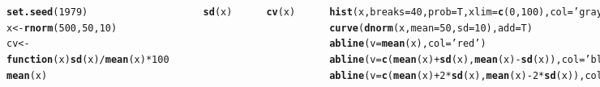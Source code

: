 \documentclass{beamer}\usepackage[]{graphicx}\usepackage[]{color}
\makeatletter
\newcommand{\hlnum}[1]{\textcolor[rgb]{0.686,0.059,0.569}{#1}}%
\newcommand{\hlstr}[1]{\textcolor[rgb]{0.192,0.494,0.8}{#1}}%
\newcommand{\hlopt}[1]{\textcolor[rgb]{0,0,0}{#1}}%
\newcommand{\hlstd}[1]{\textcolor[rgb]{0.345,0.345,0.345}{#1}}%
\newcommand{\hlkwa}[1]{\textcolor[rgb]{0.161,0.373,0.58}{\textbf{#1}}}%
\newcommand{\hlkwb}[1]{\textcolor[rgb]{0.69,0.353,0.396}{#1}}%
\newcommand{\hlkwc}[1]{\textcolor[rgb]{0.333,0.667,0.333}{#1}}%
\newcommand{\hlkwd}[1]{\textcolor[rgb]{0.737,0.353,0.396}{\textbf{#1}}}%
\newenvironment{kframe}{%
 \def\at@end@of@kframe{}%
 \ifinner\ifhmode%
  \def\at@end@of@kframe{\end{minipage}}%
  \begin{minipage}{\columnwidth}%
 \fi\fi%
 \def\FrameCommand##1{\hskip\@totalleftmargin \hskip-\fboxsep
 \colorbox{shadecolor}{##1}\hskip-\fboxsep
     \hskip-\linewidth \hskip-\@totalleftmargin \hskip\columnwidth}%
 \MakeFramed {\advance\hsize-\width
   \@totalleftmargin\z@ \linewidth\hsize
   \@setminipage}}%
 {\par\unskip\endMakeFramed%
 \at@end@of@kframe}
\newenvironment{knitrout}{}{} %
\renewenvironment{knitrout}{\setlength{\topsep}{0mm}}{}
\makeatother
\begin{document}
\begin{frame}[fragile]%

\begin{columns}[c]


\begin{knitrout}\tiny
{}\color{fgcolor}\begin{kframe}
\begin{alltt}
\hlkwd{set.seed}\hlstd{(}\hlnum{1979}\hlstd{)}
\hlstd{x} \hlkwb{<-} \hlkwd{rnorm}\hlstd{(}\hlnum{500}\hlstd{,}\hlnum{50}\hlstd{,}\hlnum{10}\hlstd{)}
\hlstd{cv} \hlkwb{<-} \hlkwa{function}\hlstd{(}\hlkwc{x}\hlstd{)} \hlkwd{sd}\hlstd{(x)}\hlopt{/}\hlkwd{mean}\hlstd{(x)} \hlopt{*} \hlnum{100}
\hlkwd{mean}\hlstd{(x)}
\end{alltt}
\begin{verbatim}
## [1] 50.36405
\end{verbatim}
\begin{alltt}
\hlkwd{sd}\hlstd{(x)}
\end{alltt}
\begin{verbatim}
## [1] 9.877513
\end{verbatim}
\begin{alltt}
\hlkwd{cv}\hlstd{(x)}
\end{alltt}
\begin{verbatim}
## [1] 19.61223
\end{verbatim}
\begin{alltt}
\hlkwd{hist}\hlstd{(x,}\hlkwc{breaks}\hlstd{=}\hlnum{40}\hlstd{,}\hlkwc{prob}\hlstd{=T,}\hlkwc{xlim}\hlstd{=}\hlkwd{c}\hlstd{(}\hlnum{0}\hlstd{,}\hlnum{100}\hlstd{),}\hlkwc{col}\hlstd{=}\hlstr{'gray70'}\hlstd{)}
\hlkwd{curve}\hlstd{(}\hlkwd{dnorm}\hlstd{(x,}\hlkwc{mean}\hlstd{=}\hlnum{50}\hlstd{,} \hlkwc{sd}\hlstd{=}\hlnum{10}\hlstd{),} \hlkwc{add}\hlstd{=T)}
\hlkwd{abline}\hlstd{(}\hlkwc{v}\hlstd{=}\hlkwd{mean}\hlstd{(x),}\hlkwc{col}\hlstd{=}\hlstr{'red'}\hlstd{)}
\hlkwd{abline}\hlstd{(}\hlkwc{v}\hlstd{=}\hlkwd{c}\hlstd{(}\hlkwd{mean}\hlstd{(x)}\hlopt{+}\hlkwd{sd}\hlstd{(x),}\hlkwd{mean}\hlstd{(x)}\hlopt{-}\hlkwd{sd}\hlstd{(x)),}\hlkwc{col}\hlstd{=}\hlstr{'blue'}\hlstd{)}
\hlkwd{abline}\hlstd{(}\hlkwc{v}\hlstd{=}\hlkwd{c}\hlstd{(}\hlkwd{mean}\hlstd{(x)}\hlopt{+}\hlnum{2}\hlopt{*}\hlkwd{sd}\hlstd{(x),}\hlkwd{mean}\hlstd{(x)}\hlopt{-}\hlnum{2}\hlopt{*}\hlkwd{sd}\hlstd{(x)),}\hlkwc{col}\hlstd{=}\hlstr{'purple'}\hlstd{)}
\end{alltt}
\end{kframe}
\end{knitrout}


\end{columns}
\end{frame}
\end{document}
